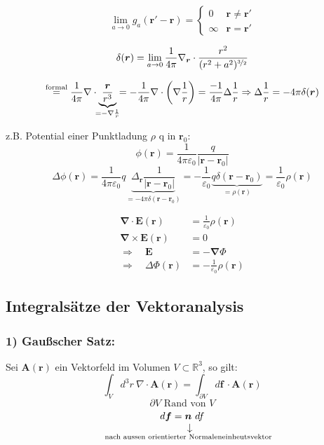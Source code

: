 \documentclass[titlepage,11pt,a4paper,ngerman]{report}
\newcommand{\tx}[1]{\textrm{#1}}
\newcommand{\custo}[3]{\underset{\scriptstyle\overset{\mkern4mu\rotatebox{-90}{$\,#1$}}{#3}}{#2}}
\renewcommand{\Phi}{\varPhi}
\newcommand{\kq}{\frac{1}{4\pi\epsilon_0}}
\renewcommand{\vec}[1]{\boldsymbol{#1}}
\renewcommand{\epsilon}{\varepsilon}
\renewcommand{\paragraph}[1]{\subsubsection{#1}}
\newcommand{\bbb}[2]{\begin{tcolorbox}[colback=white,colframe=black,fonttitle=\bfseries,title=#1,sharp corners,tcbox raise base]#2\end{tcolorbox}}
\begin{document}
$$\lim_{a \to 0} g_a(\vec{r}' - \vec{r}) = \left\{ \begin{array}{cc}
0 		& \vec{r} \neq  \vec{r}'\\
\infty 	& \vec{r} = 	\vec{r}'
\end{array} \right.$$

$$\delta(\vec{r}) = \lim_{a \to 0} \frac{1}{4 \pi} \nabla_{\vec{r}} \cdot \frac{r^2}{(r^2+a^2)^{\nicefrac{3}{2}}}$$

$$\overset{\textrm{formal}}{=} \frac{1}{4 \pi} \nabla \cdot \underbrace{\frac{\vec{r}}{r^3}}_{\mathclap{= - \nabla \frac{1}{r}}} = - \frac{1}{4 \pi} \nabla \cdot \bigg(\nabla \frac{1}{r}\bigg) = \frac{-1}{4 \pi} \Delta \frac{1}{r} \Rightarrow \Delta \frac{1}{r} = -4 \pi \delta(\vec{r})$$

z.B. Potential einer Punktladung $\rho$ q in $\vec{r}_0$:
$$\phi(\vec{r}) = \kq \frac{q}{|\vec{r} - \vec{r}_0|}$$
$$\Delta \phi(\vec{r}) = \kq q \underbrace{\Delta_{\vec{r}} \frac{1}{|\vec{r} - \vec{r}_0|} }_{= - 4 \pi \delta(\vec{r} - \vec{r}_0)} = - \frac{1}{\epsilon_0} \underbrace{q \delta(\vec{r} - \vec{r}_0)}_{= \rho(\vec{r})} = \frac{1}{\epsilon_0} \rho(\vec{r})$$


\bbb{Wiederholung}{\begin{align*}
	\vec{\nabla} \cdot \vec{E}(\vec{r}) &= \frac{1}{\epsilon_0} \rho(\vec{r})\\
	\vec{\nabla} \times \vec{E}(\vec{r}) &= 0 \\[10pt]
	\Rightarrow \quad \vec{E} &= - \vec{\nabla} \Phi \\
	\Rightarrow \quad \Delta \Phi (\vec{r}) &= - \frac{1}{\epsilon_0} \rho(\vec{r})
	\end{align*}
}

\subsection{Integralsätze der Vektoranalysis}

\paragraph{1) Gaußscher Satz:} 
Sei $\vec{A}(\vec{r})$ ein Vektorfeld im Volumen $V \subset \mathbb R^3$, so gilt:
$$\int_V d^3r\ \nabla \cdot \vec{A}(\vec{r}) = \int_{\partial V} d\vec{f}\ \cdot \vec{A}(\vec{r})$$
$$\partial V \tx{ Rand von } V$$
$$d \vec{f} = \custo{\rightarrow}{\vec{n}}{\mathclap{\textrm{nach aussen orientierter Normaleneinheutsvektor}}}\ df$$
\end{document}
